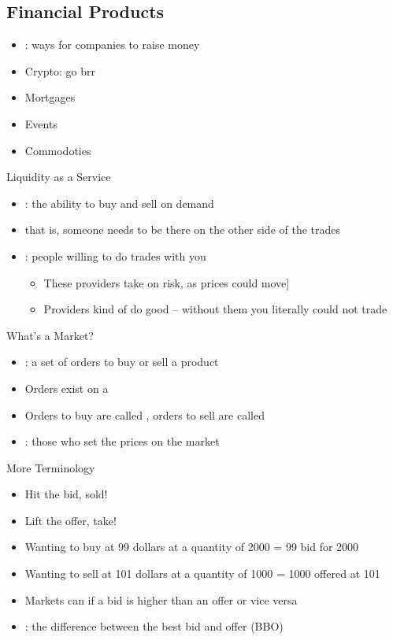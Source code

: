 \subsection{Financial Products}
\begin{itemize}
    \item {}: ways for companies to raise money
    \item Crypto: go brr
    \item Mortgages
    \item Events
    \item Commodoties
\end{itemize}

Liquidity as a Service
\begin{itemize}
    \item {}: the ability to buy and sell on demand
    \item that is, someone needs to be there on the other side of the trades
    \item {}: people willing to do trades with you
        \begin{itemize}
            \item These providers take on risk, as prices could move]
            \item Providers kind of do good -- without them you literally could not trade
        \end{itemize}
\end{itemize}

What's a Market?
\begin{itemize}
    \item {}: a set of orders to buy or sell a product
    \item Orders exist on a 
    \item Orders to buy are called , orders to sell are called 
    \item {}: those who set the prices on the market
\end{itemize}

More Terminology
\begin{itemize}
    \item Hit the bid, sold!
    \item Lift the offer, take!
    \item Wanting to buy at 99 dollars at a quantity of 2000 = 99 bid for 2000
    \item Wanting to sell at 101 dollars at a quantity of 1000 = 1000 offered at 101
    \item Markets can  if a bid is higher than an offer or vice versa
    \item {}: the difference between the best bid and offer (BBO)
\end{itemize}

